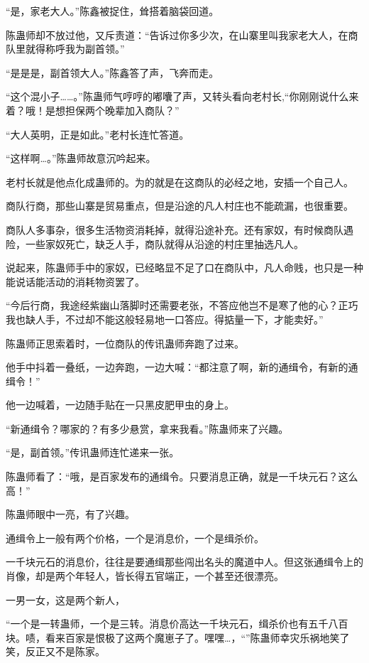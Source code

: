 \begin{this_body}
“是，家老大人。”陈鑫被捉住，耸搭着脑袋回道。

陈蛊师却不放过他，又斥责道：“告诉过你多少次，在山寨里叫我家老大人，在商队里就得称呼我为副首领。”

“是是是，副首领大人。”陈鑫答了声，飞奔而走。

“这个混小子……。”陈蛊师气哼哼的嘟囔了声，又转头看向老村长,“你刚刚说什么来着？哦！是想担保两个晚辈加入商队？”

“大人英明，正是如此。”老村长连忙答道。

“这样啊…。”陈蛊师故意沉吟起来。

老村长就是他点化成蛊师的。为的就是在这商队的必经之地，安插一个自己人。

商队行商，那些山寨是贸易重点，但是沿途的凡人村庄也不能疏漏，也很重要。

商队人多事杂，很多生活物资消耗掉，就得沿途补充。还有家奴，有时候商队遇险，一些家奴死亡，缺乏人手，商队就得从沿途的村庄里抽选凡人。

说起来，陈蛊师手中的家奴，已经略显不足了口在商队中，凡人命贱，也只是一种能说话能活动的消耗物资罢了。

“今后行商，我途经紫幽山落脚时还需要老张，不答应他岂不是寒了他的心？正巧我也缺人手，不过却不能这般轻易地一口答应。得掂量一下，才能卖好。”

陈蛊师正思索着时，一位商队的传讯蛊师奔跑了过来。

他手中抖着一叠纸，一边奔跑，一边大喊：“都注意了啊，新的通缉令，有新的通缉令！”

他一边喊着，一边随手贴在一只黑皮肥甲虫的身上。

“新通缉令？哪家的？有多少悬赏，拿来我看。”陈蛊师来了兴趣。

“是，副首领。”传讯蛊师连忙递来一张。

陈蛊师看了：“哦，是百家发布的通缉令。只要消息正确，就是一千块元石？这么高！”

陈蛊师眼中一亮，有了兴趣。

通缉令上一般有两个价格，一个是消息价，一个是缉杀价。

一千块元石的消息价，往往是要通缉那些闯出名头的魔道中人。但这张通缉令上的肖像，却是两个年轻人，皆长得五官端正，一个甚至还很漂亮。

一男一女，这是两个新人，

“一个是一转蛊师，一个是三转。消息价高达一千块元石，缉杀价也有五千八百块。啧，看来百家是恨极了这两个魔崽子了。嘿嘿…，“”陈蛊师幸灾乐祸地笑了笑，反正又不是陈家。


\end{this_body}
